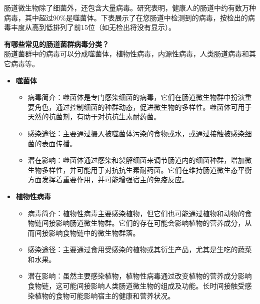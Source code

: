 \documentclass[UTF8]{ctexart}
\begin{document}
\begin{tcolorbox}[
    enhanced,
    colback=customTealBg,
    colframe=customTealBg,
    arc=3mm,
    boxrule=0pt,
    width=\textwidth,
    top=8pt,
    bottom=8pt
]
{\small{\color{customTeal}\faInfoCircle} 肠道微生物除了细菌外，还包含大量病毒。研究表明，健康人的肠道中约有数万种病毒，其中超过90\%是噬菌体。下表展示了在您肠道中检测到的病毒，按检出的病毒丰度从高到低排列了前15位（如无检出将没有显示）。
}
\end{tcolorbox}

\begin{tcolorbox}[
    enhanced,
    colback=lightpurple!10, %
    colframe=white,  %
    arc=3mm,
    boxrule=0.5pt,
    width=\textwidth,
    top=8pt,
    bottom=8pt
]
{\small{\color{lightpurple}\faQuestionCircle}\quad \textbf{有哪些常见的肠道菌群病毒分类？}\\
{\color{orange!50}\faComments}\quad 肠道菌群中的病毒可以分成噬菌体，植物性病毒，内源性病毒，人类肠道病毒和其它病毒等。
\begin{itemize}
    \item \textbf{噬菌体}
    \begin{itemize}
        \item 病毒简介：噬菌体是专门感染细菌的病毒，它们在肠道微生物群中扮演重要角色，通过控制细菌的种群动态，促进微生物的多样性。噬菌体可用于天然的抗菌剂，有助于对抗抗生素耐药菌。
        \item 感染途径：主要通过摄入被噬菌体污染的食物或水，或通过接触被感染细菌的表面传播。
        \item 潜在影响：噬菌体通过感染和裂解细菌来调节肠道内的细菌种群，增加微生物多样性，并可能用于对抗抗生素耐药菌。它们在维持肠道微生态平衡方面发挥着重要作用，并可能增强宿主的免疫反应。
    \end{itemize}
    \item \textbf{植物性病毒}
    \begin{itemize}
        \item 病毒简介：植物性病毒主要感染植物，但它们也可能通过植物和动物的食物链间接影响肠道微生物群。它们的存在可能会影响植物的营养成分，从而间接影响食物链中的微生物群落。
        \item 感染途径：主要通过食用受感染的植物或其衍生产品，尤其是生吃的蔬菜和水果。
        \item 潜在影响：虽然主要感染植物，植物性病毒通过改变植物的营养成分影响食物链，这可能间接影响人类肠道微生物的组成及功能。长时间接触受感染植物的食物可能影响宿主的健康和营养状况。
    \end{itemize}

\end{itemize}}
\end{tcolorbox}
\end{document}
